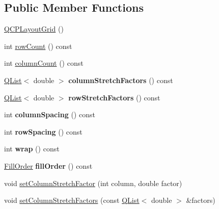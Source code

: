 \subsection*{Public Member Functions}
\begin{DoxyCompactItemize}
\item 
\hyperlink{class_q_c_p_layout_grid_ab2a4c1587dc8aed4c41c509c8d8d2a64}{Q\+C\+P\+Layout\+Grid} ()
\item 
int \hyperlink{class_q_c_p_layout_grid_a19c66fd76cbce58a8e94f33797e0c0aa}{row\+Count} () const
\item 
int \hyperlink{class_q_c_p_layout_grid_a1a2962cbf45011405b64b913afa8e7a2}{column\+Count} () const
\item 
\mbox{\label{class_q_c_p_layout_grid_a8e0e587c386bbcd1b94119f5f44c512d}} 
\hyperlink{class_q_list}{Q\+List}$<$ double $>$ {\bfseries column\+Stretch\+Factors} () const
\item 
\mbox{\label{class_q_c_p_layout_grid_aa33408586427e77e05f79defde7f3568}} 
\hyperlink{class_q_list}{Q\+List}$<$ double $>$ {\bfseries row\+Stretch\+Factors} () const
\item 
\mbox{\label{class_q_c_p_layout_grid_adcf4c387d5996bf6e4ae0ed26138247e}} 
int {\bfseries column\+Spacing} () const
\item 
\mbox{\label{class_q_c_p_layout_grid_a4cb6c680505cd0ce6f85b9e217fd2cd0}} 
int {\bfseries row\+Spacing} () const
\item 
\mbox{\label{class_q_c_p_layout_grid_a8bb71b52b2796c9f05fae6a32d2d0efd}} 
int {\bfseries wrap} () const
\item 
\mbox{\label{class_q_c_p_layout_grid_a6cb6563a13759222ad92ae397bd6c27e}} 
\hyperlink{class_q_c_p_layout_grid_a7d49ee08773de6b2fd246edfed353cca}{Fill\+Order} {\bfseries fill\+Order} () const
\item 
void \hyperlink{class_q_c_p_layout_grid_ae38f31a71687b9d7ee3104852528fb50}{set\+Column\+Stretch\+Factor} (int column, double factor)
\item 
void \hyperlink{class_q_c_p_layout_grid_a6c2591d1a7e2534ce036989543b49e57}{set\+Column\+Stretch\+Factors} (const \hyperlink{class_q_list}{Q\+List}$<$ double $>$ \&factors)

\end{DoxyCompactItemize}
